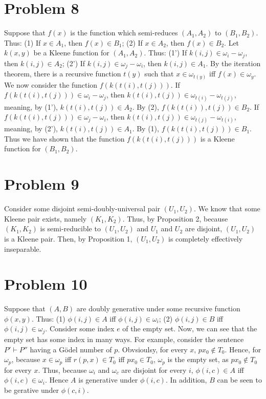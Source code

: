\documentclass{article}
\theoremstyle{definition}
\begin{document}
\section*{Problem 8}
Suppose that $f(x)$ is the function which semi-reduces $(A_1,A_2)$ to $(B_1,B_2)$. Thus:\newline
(1) If $x\in A_1$, then $f(x)\in B_1$;\newline
(2) If $x\in A_2$, then $f(x)\in B_2$.\newline
Let $k(x,y)$ be a Kleene function for $(A_1,A_2)$. Thus:\newline
(1') If $k(i,j)\in\omega_i-\omega_j$, then $k(i,j)\in A_2$;\newline
(2') If $k(i,j)\in\omega_j-\omega_i$, then $k(i,j)\in A_1$.\newline
By the iteration theorem, there is a recursive function $t(y)$ such that $x\in\omega_{t(y)}$ iff $f(x)\in\omega_y$. We now consider the function $f(k(t(i),t(j)))$.
If $f(k(t(i),t(j)))\in\omega_i-\omega_j$, then $k(t(i),t(j))\in\omega_{t(i)}-\omega_{t(j)}$, meaning, by (1'), $k(t(i),t(j))\in A_2$. By (2), $f(k(t(i)),t(j))\in B_2$. 
If $f(k(t(i),t(j)))\in\omega_j-\omega_i$, then $k(t(i),t(j))\in\omega_{t(j)}-\omega_{t(i)}$, meaning, by (2'), $k(t(i),t(j))\in A_1$. By (1), $f(k(t(i),t(j)))\in B_1$. Thus we have shown that 
the function $f(k(t(i),t(j)))$ is a Kleene function for $(B_1,B_2)$.

\section*{Problem 9}
Consider some disjoint semi-doubly-universal pair $(U_1,U_2)$. We know that some Kleene pair exists, namely $(K_1,K_2)$. Thus, by Proposition 2, because $(K_1,K_2)$ is semi-reducible to 
$(U_1,U_2)$ and $U_1$ and $U_2$ are disjoint, $(U_1,U_2)$ is a Kleene pair. Then, by Proposition 1, $(U_1,U_2)$ is completely effectively inseparable.

\section*{Problem 10}
Suppose that $(A,B)$ are doubly generative under some recursive function $\phi(x,y)$. Thus:\newline
(1) $\phi(i,j)\in A$ iff $\phi(i,j)\in\omega_i$;\newline
(2) $\phi(i,j)\in B$ iff $\phi(i,j)\in\omega_j$.\newline
Consider some index $e$ of the empty set. Now, we can see that the empty set has some index in many ways. For example, 
consider the sentence $P'\vdash P''$ having a Gödel number of $p$. Obvsioulsy, for every $x$, $px_0\notin T_0$. Hence, for $\omega_p$, because $x\in\omega_p$ iff 
$r(p,x)\in T_0$ iff $px_0\in T_0$, $\omega_p$ is the empty set, as $px_0\notin T_0$ for every $x$. Thus, because $\omega_i$ and $\omega_c$ are disjoint 
for every $i$, $\phi(i,c)\in A$ iff $\phi(i,c)\in\omega_i$. Hence $A$ is generative under $\phi(i,c)$. In addition, $B$ can be seen to be gerative under $\phi(c,i)$. 
\end{document}
